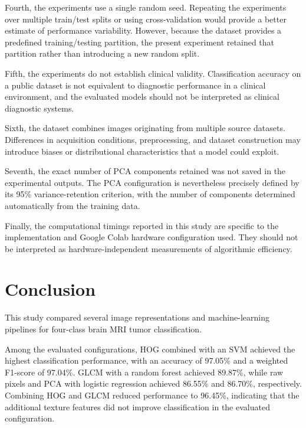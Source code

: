 \documentclass[11pt,a4paper]{article}
\begin{document}
Fourth, the experiments use a single random seed. Repeating the experiments over multiple train/test splits or using cross-validation would provide a better estimate of performance variability. However, because the dataset provides a predefined training/testing partition, the present experiment retained that partition rather than introducing a new random split.

Fifth, the experiments do not establish clinical validity. Classification accuracy on a public dataset is not equivalent to diagnostic performance in a clinical environment, and the evaluated models should not be interpreted as clinical diagnostic systems.

Sixth, the dataset combines images originating from multiple source datasets. Differences in acquisition conditions, preprocessing, and dataset construction may introduce biases or distributional characteristics that a model could exploit.

Seventh, the exact number of PCA components retained was not saved in the experimental outputs. The PCA configuration is nevertheless precisely defined by its 95\% variance-retention criterion, with the number of components determined automatically from the training data.

Finally, the computational timings reported in this study are specific to the implementation and Google Colab hardware configuration used. They should not be interpreted as hardware-independent measurements of algorithmic efficiency.


\section{Conclusion}

This study compared several image representations and machine-learning pipelines for four-class brain MRI tumor classification.

Among the evaluated configurations, HOG combined with an SVM achieved the highest classification performance, with an accuracy of 97.05\% and a weighted F1-score of 97.04\%. GLCM with a random forest achieved 89.87\%, while raw pixels and PCA with logistic regression achieved 86.55\% and 86.70\%, respectively. Combining HOG and GLCM reduced performance to 96.45\%, indicating that the additional texture features did not improve classification in the evaluated configuration.
\end{document}

